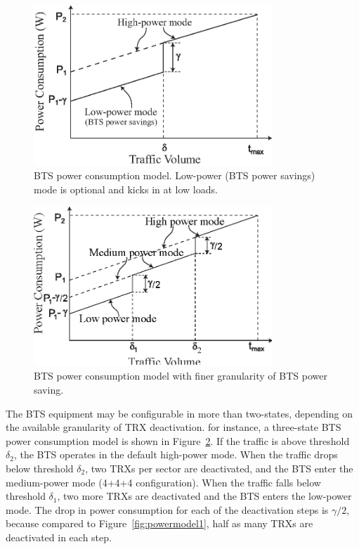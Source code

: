 \begin{figure}
\centering
\includegraphics[width=0.8\textwidth]{pics/powermodel.eps}
\caption{BTS power consumption model. Low-power (BTS power savings) mode is optional and kicks in at low loads.}
\label{fig:powermodel}
\end{figure}

\begin{figure}
\centering
\includegraphics[width=0.8\textwidth]{pics/powermodel2-1.eps}
\caption{BTS power consumption model with finer granularity of BTS power saving.}
\label{fig:powermodel2}
\end{figure}

The BTS equipment may be configurable in more than two-states, depending on the available granularity of TRX deactivation. for instance, a three-state BTS power consumption model is shown in Figure~\ref{fig:powermodel2}. If the traffic is above threshold $\delta_2$, the BTS operates in the default high-power mode. When the traffic drops below threshold $\delta_2$, two TRXs per sector are deactivated, and the BTS enter the medium-power mode (4+4+4 configuration). When the traffic falls below threshold $\delta_1$, two more TRXs are deactivated and the BTS enters the low-power mode. The drop in power consumption for each of the deactivation steps is $\gamma/2$, because compared to Figure~\ref{fig:powermodel1}, half as many TRXs are deactivated in each step.


